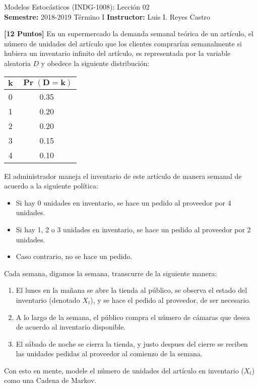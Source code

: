 \documentclass[ a4paper, twoside, 11pt]{article}
\newcommand{\numero}{02}
\begin{document}
\allowdisplaybreaks



\begin{center}
\Large Modelos Estoc\'asticos (INDG-1008): Lecci\'on \numero \\[1ex]
\small \textbf{Semestre:} 2018-2019 T\'ermino I \qquad
\textbf{Instructor:} Luis I. Reyes Castro
\end{center}
\fullskip

\begin{problem}
\textbf{[12 Puntos]} En un supermercado la demanda semanal te\'orica de un art\'iculo, \ie el n\'umero de unidades del art\'iculo que los clientes comprar\'ian semanalmente si hubiera un inventario infinito del art\'iculo, es representada por la variable aleatoria $D$ y obedece la siguiente distribuci\'on: 

\begin{table}[htb]
\centering
\begin{tabular}{|c|c|}
\hline
$\boldsymbol{k}$ & $\boldsymbol{\Pr( D  = k )}$ \\ \hline
0 & 0.35 \\ \hline
1 & 0.20 \\ \hline
2 & 0.20 \\ \hline
3 & 0.15 \\ \hline
4 & 0.10 \\ \hline
\end{tabular}
\end{table}

El administrador maneja el inventario de este art\'iculo de manera semanal de acuerdo a la siguiente pol\'itica:
\begin{itemize}
\item Si hay 0 unidades en inventario, se hace un pedido al proveedor por 4 unidades. 
\item Si hay 1, 2 o 3 unidades en inventario, se hace un pedido al proveedor por 2 unidades. 
\item Caso contrario, no se hace un pedido. 
\end{itemize}

Cada semana, digamos la \tava semana, transcurre de la siguiente manera: 
\begin{enumerate}
\item El lunes en la ma\~nana se abre la tienda al p\'ublico, se observa el estado del inventario (denotado $X_t$), y se hace el pedido al proveedor, de ser necesario. 
\item A lo largo de la semana, el p\'ublico compra el n\'umero de c\'amaras que desea de acuerdo al inventario disponible. 
\item El s\'abado de noche se cierra la tienda, y justo despues del cierre se reciben las unidades pedidas al proveedor al comienzo de la semana. 
\end{enumerate}

Con esto en mente, modele el n\'umero de unidades del art\'iculo en inventario (\ie $X_t$) como una Cadena de Markov. 

\end{problem}
\vspace{\baselineskip}
\end{document}
